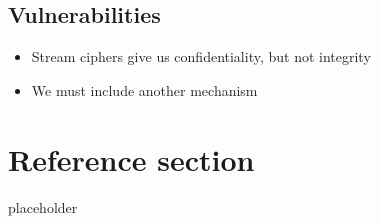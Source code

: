 \documentclass{article}
\begin{document}
\subsection{Vulnerabilities}
\begin{itemize}
  \item Stream ciphers give us confidentiality, but not integrity 
  \item We must include another mechanism
\end{itemize}

\pagebreak
\section*{Reference section} \label{sec:reference}
\begin{description}
	\item[placeholder] \hfill \\
\end{description}
\end{document}
